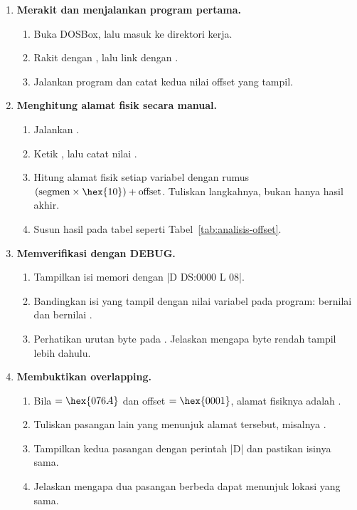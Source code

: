 \begin{enumerate}
    \item \textbf{Merakit dan menjalankan program pertama.}
    \begin{enumerate}
        \item Buka DOSBox, lalu masuk ke direktori kerja.
        \item Rakit  dengan
              , lalu link dengan
              .
        \item Jalankan program dan catat kedua nilai offset yang
              tampil.
    \end{enumerate}

    \item \textbf{Menghitung alamat fisik secara manual.}
    \begin{enumerate}
        \item Jalankan .
        \item Ketik , lalu catat nilai .
        \item Hitung alamat fisik setiap variabel dengan rumus
              $(\text{segmen} \times \hex{10}) + \text{offset}$.
              Tuliskan langkahnya, bukan hanya hasil akhir.
        \item Susun hasil pada tabel seperti
              Tabel~\ref{tab:analisis-offset}.
    \end{enumerate}

    \item \textbf{Memverifikasi dengan DEBUG.}
    \begin{enumerate}
        \item Tampilkan isi memori dengan
              \lstasm|D DS:0000 L 08|.
        \item Bandingkan isi yang tampil dengan nilai variabel pada
              program:  bernilai  dan
               bernilai .
        \item Perhatikan urutan byte pada . Jelaskan
              mengapa byte rendah tampil lebih dahulu.
    \end{enumerate}

    \item \textbf{Membuktikan overlapping.}
    \begin{enumerate}
        \item Bila  $= \hex{076A}$ dan offset
               $= \hex{0001}$, alamat fisiknya adalah
              .
        \item Tuliskan pasangan lain yang menunjuk alamat tersebut,
              misalnya .
        \item Tampilkan kedua pasangan dengan perintah
              \lstasm|D| dan pastikan isinya sama.
        \item Jelaskan mengapa dua pasangan berbeda dapat menunjuk
              lokasi yang sama.
    \end{enumerate}


\end{enumerate}
